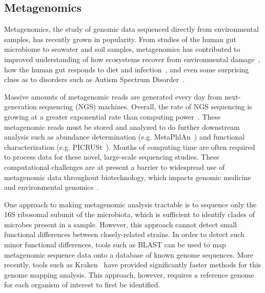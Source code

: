 \documentclass[review,preprint,12pt]{elsarticle}
\renewcommand{\cite}{\citep} %
\theoremstyle{definition}
\theoremstyle{remark}
\numberwithin{equation}{section}
\begin{document}
\subsection{Metagenomics}

Metagenomics, the study of genomic data sequenced directly from environmental
samples, has recently grown in popularity.
From studies of the human gut microbiome to seawater and soil samples,
metagenomics has contributed to improved understanding of how ecosystems recover
from environmental damage~\cite{tyson2004community}, how the human gut responds 
to diet
and infection~\cite{david2014host}, and even some surprising clues as to disorders 
such as Autism Spectrum Disorder~\cite{macfabe2012short}.

Massive amounts of metagenomic reads are generated every day from 
next-generation sequencing (NGS) machines.
Overall, the rate of NGS sequencing is growing at a greater exponential rate
than computing power~\cite{loh2012compressive}.
These metagenomic reads must be stored and analyzed to do further downstream
analysis such as abundance determination (e.g. 
MetaPhlAn~\cite{segata2012metagenomic}) 
and functional characterization (e.g. PICRUSt~\cite{langille2013predictive}).
 Months of computing time are often required to process data for these novel, 
large-scale sequencing studies.
These computational challenges are at present a barrier to widespread use of 
metagenomic data throughout biotechnology, which impacts genomic medicine and 
environmental genomics~\cite{frank2008gastrointestinal}.

One approach to making metagenomic analysis tractable is to
sequence only the 16S ribosomal subunit of the microbiota, which is sufficient
to identify clades of microbes present in a sample. 
However, this approach cannot detect small functional differences between 
closely-related strains. 
In order to detect such minor functional differences, tools such as BLAST can 
be used to map metagenomic sequence data onto a database of known genome
sequences.
More recently, tools such as Kraken~\cite{wood2014kraken} have provided 
significantly faster methods for this genome mapping analysis.
This approach, however, requires a reference genome for each organism of
interest to first be identified.
\end{document}
